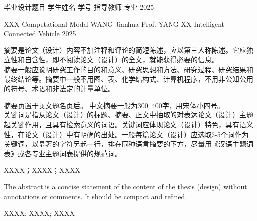 \documentclass{document}
\begin{document}
\makecovercn
  {毕业设计题目}
  {学生姓名}
  {学号}
  {指导教师}
  {}%
  {专业}
  {}%
  {2025}

\makecoveren
  {XXX Computational Model}
  {WANG Jianhua}
  {Prof. YANG XX}
  {} %
  {Intelligent Connected Vehicle}
  {} %
  {} %
  {2025} 


\begin{cquabstract}

摘要是论文（设计）内容不加注释和评论的简短陈述，应以第三人称陈述。它应独立性和自含性，即不阅读论文（设计）的全文，就能获得必要的信息。\\

摘要一般应说明研究工作的目的和意义、研究思想和方法、研究过程、研究结果和最终结论等。摘要中一般不用图、表、化学结构式、计算机程序，不用非公知公用的符号、术语和非法定的计量单位。

摘要页置于英文题名页后。 
中文摘要一般为300~400字，用宋体小四号。 \\
关键词是指从论文（设计）的标题、摘要、正文中抽取的对表达论文（设计）主题起关键作用，且具有检索意义的词语。关键词应体现论文（设计）特色，具有语义性，在论文（设计）中有明确的出处。一般每篇论文（设计）应选取3-5个词作为关键词，以显著的字符另起一行，排在同种语言摘要的下方，尽量用《汉语主题词表》或各专业主题词表提供的规范词。\\
\end{cquabstract}
  
\begin{cqukeywords}%
    XXXX；XXXX；XXXX
\end{cqukeywords}

\begin{cquabstracten}
  The abstract is a concise statement of the content of the thesis (design) without annotations or comments. It should be compact and refined.
\end{cquabstracten}

\begin{cqukeywordsen}
  XXXX; XXXX; XXXX
\end{cqukeywordsen}
  
\begin{cqucontents}

\end{cqucontents}
\end{document}
